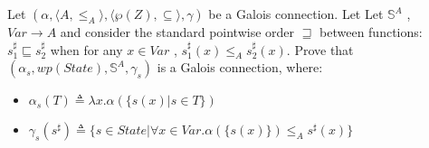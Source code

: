 {
Let $(\alpha, \langle A, \leq_A \rangle, \langle \wp(Z), \subseteq \rangle, \gamma)$ be a Galois connection. Let 
Let $\mathbb{S}^A$ , $Var \to A$ and consider the standard pointwise order $\sqsupseteq$ between
functions: $s^\sharp_1 \sqsubseteq s^\sharp_2$ when for any $x \in Var$ , $s^\sharp_1 (x) \leq_A s^\sharp_2 (x)$. Prove that $(\alpha_s , wp(State), \mathbb{S}^A , \gamma_s)$ is a Galois connection, where:
\begin{itemize}
\item $\alpha_s (T) \triangleq  \lambda x . \alpha(\{s(x) | s \in T \})$
\item $\gamma_s (s^\sharp) \triangleq \{s \in State | \forall x \in Var . \alpha(\{s(x)\}) \leq_A s^\sharp(x)\}$
\end{itemize}
}
{}
